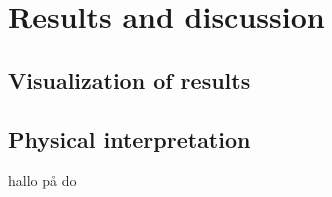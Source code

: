 \section{Results and discussion}

\subsection{Visualization of results}

\subsection{Physical interpretation}

hallo på do